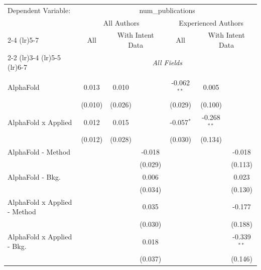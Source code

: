 \begingroup
\centering
\begin{tabular}{lcccccc}
   \tabularnewline \midrule \midrule
   Dependent Variable: & \multicolumn{6}{c}{num\_publications}\\
 & \multicolumn{3}{c}{All Authors} & \multicolumn{3}{c}{Experienced Authors} \\
\cmidrule(lr){2-4} \cmidrule(lr){5-7}
 & \multicolumn{1}{c}{All} & \multicolumn{2}{c}{With Intent Data} & \multicolumn{1}{c}{All} & \multicolumn{2}{c}{With Intent Data} \\
\cmidrule(lr){2-2} \cmidrule(lr){3-4} \cmidrule(lr){5-5} \cmidrule(lr){6-7}
 & \multicolumn{6}{c}{\textit{All Fields}} \\ \\
   AlphaFold                      & 0.013         & 0.010        &              & -0.062$^{**}$ & 0.005         &   \\   
                                  & (0.010)       & (0.026)      &              & (0.029)       & (0.100)       &   \\   
   AlphaFold x Applied            & 0.012         & 0.015        &              & -0.057$^{*}$  & -0.268$^{**}$ &   \\   
                                  & (0.012)       & (0.028)      &              & (0.030)       & (0.134)       &   \\   
   AlphaFold - Method             &               &              & -0.018       &               &               & -0.018\\   
                                  &               &              & (0.029)      &               &               & (0.113)\\   
   AlphaFold - Bkg.               &               &              & 0.006        &               &               & 0.023\\   
                                  &               &              & (0.034)      &               &               & (0.130)\\   
   AlphaFold x Applied - Method   &               &              & 0.035        &               &               & -0.177\\   
                                  &               &              & (0.030)      &               &               & (0.188)\\   
   AlphaFold x Applied - Bkg.     &               &              & 0.018        &               &               & -0.339$^{**}$\\   
                                  &               &              & (0.037)      &               &               & (0.146)\\   

\end{tabular}
